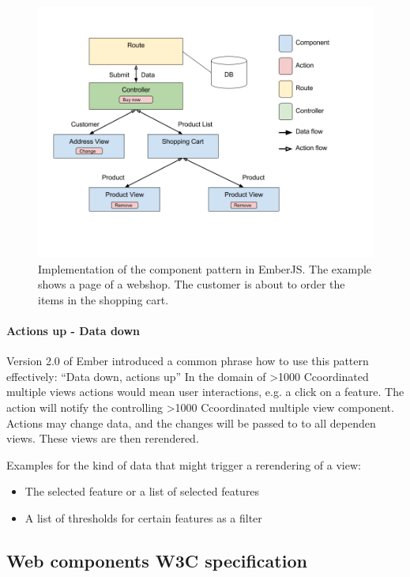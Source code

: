 \documentclass{article}
\newcommand\hmm[1]{\ifnum\ifhmode\spacefactor\else2000\fi>1000 \uppercase{#1}\else#1\fi}
\newcommand{\cmv}{\hmm{c}oordinated multiple view}
\newcommand{\cmvs}{\hmm{c}oordinated multiple views}
\begin{document}
\begin{figure}[h!]
  \centering
  \includegraphics[width=\textwidth]{images/data-down-actions-up.png}
  \caption{Implementation of the component pattern in EmberJS.
  The example shows a page of a webshop.
  The customer is about to order the items in the shopping cart.}
  \label{fig:implementation:data-down-actions-up}
\end{figure}

\paragraph{Actions up - Data down}

Version 2.0 of Ember introduced a common phrase how to use this pattern effectively: ``Data down, actions up''\cite{Emberigniter2017}
In the domain of \cmvs{} actions would mean user interactions, e.g. a click on a feature.
The action will notify the controlling \cmv{} component.
Actions may change data, and the changes will be passed to to all dependen views.
These views are then rerendered.

Examples for the kind of data that might trigger a rerendering of a view:
\begin{itemize}
  \item
    The selected feature or a list of selected features
  \item
    A list of thresholds for certain features as a filter
\end{itemize}

\subsection{Web components W3C specification}
\end{document}

